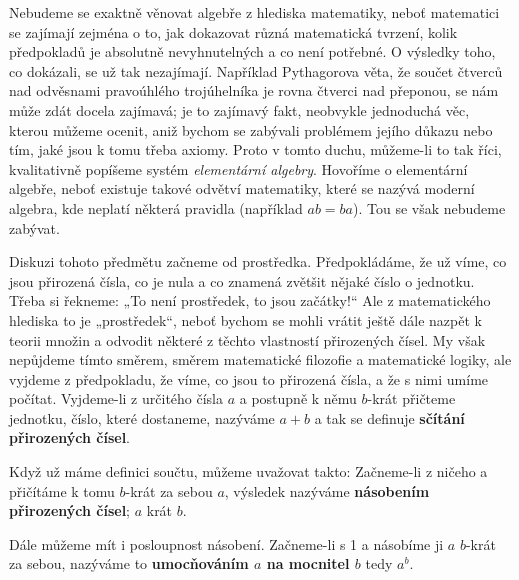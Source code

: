     Nebudeme se exaktně věnovat algebře z hlediska matematiky, neboť matematici se zajímají zejména
    o to, jak dokazovat různá matematická tvrzení, kolik předpokladů je absolutně nevyhnutelných a
    co není potřebné. O výsledky toho, co dokázali, se už tak nezajímají. Například Pythagorova
    věta, že součet čtverců nad odvěsnami pravoúhlého trojúhelníka je rovna čtverci nad přeponou, se
    nám může zdát docela zajímavá; je to zajímavý fakt, neobvykle jednoduchá věc, kterou můžeme
    ocenit, aniž bychom se zabývali problémem jejího důkazu nebo tím, jaké jsou k tomu třeba axiomy.
    Proto v tomto duchu, můžeme-li to tak říci, kvalitativně popíšeme systém \emph{elementární
    algebry}. Hovoříme o elementární algebře, neboť existuje takové odvětví matematiky, které se
    nazývá moderní algebra, kde neplatí některá pravidla (například \(ab = ba\)). Tou se však
    nebudeme zabývat.
    
    Diskuzi tohoto předmětu začneme od prostředka. Předpokládáme, že už víme, co jsou přirozená
    čísla, co je nula a co znamená zvětšit nějaké číslo o jednotku. Třeba si řekneme: „To není
    prostředek, to jsou začátky!“ Ale z matematického hlediska to je „prostředek“, neboť bychom se
    mohli vrátit ještě dále nazpět k teorii množin a odvodit některé z těchto vlastností přirozených
    čísel. My však nepůjdeme tímto směrem, směrem matematické ﬁlozoﬁe a matematické logiky, ale
    vyjdeme z předpokladu, že víme, co jsou to přirozená čísla, a že s nimi umíme počítat.
    Vyjdeme-li z určitého čísla \(a\) a postupně k němu \(b\)-krát přičteme jednotku, číslo, které
    dostaneme, nazýváme \(a + b\) a tak se definuje \textbf{sčítání přirozených čísel}.
    
    Když už máme deﬁnici součtu, můžeme uvažovat takto: Začneme-li z ničeho a přičítáme k tomu
    \(b\)-krát za sebou \(a\), výsledek nazýváme \textbf{násobením přirozených čísel}; \(a\) krát
    \(b\).
    
    Dále můžeme mít i posloupnost násobení. Začneme-li s 1 a násobíme ji \(a\) \(b\)-krát za sebou,
    nazýváme to \textbf{umocňováním \(a\) na mocnitel \(b\)} tedy \(a^b\).
    
